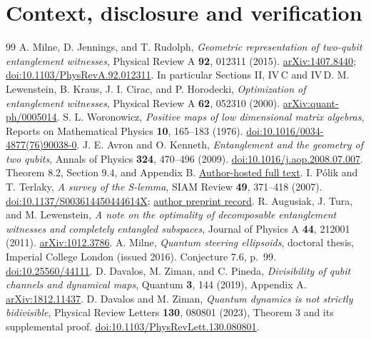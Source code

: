 \documentclass[11pt,a4paper]{article}
\theoremstyle{definition}\newtheorem{definition}[theorem]{Definition}
\theoremstyle{plain}\newtheorem*{theorem*}{Theorem}
\begin{document}
\part{Context, disclosure and verification}

\appendix

\clearpage
\begin{thebibliography}{99}
 A. Milne, D. Jennings, and T. Rudolph, \emph{Geometric representation of two-qubit entanglement witnesses}, Physical Review A \textbf{92}, 012311 (2015). \href{https://arxiv.org/abs/1407.8440}{arXiv:1407.8440}; \href{https://doi.org/10.1103/PhysRevA.92.012311}{doi:10.1103/PhysRevA.92.012311}. In particular Sections II, IV\,C and IV\,D.
 M. Lewenstein, B. Kraus, J. I. Cirac, and P. Horodecki, \emph{Optimization of entanglement witnesses}, Physical Review A \textbf{62}, 052310 (2000). \href{https://arxiv.org/abs/quant-ph/0005014}{arXiv:quant-ph/0005014}.
 S. L. Woronowicz, \emph{Positive maps of low dimensional matrix algebras}, Reports on Mathematical Physics \textbf{10}, 165--183 (1976). \href{https://doi.org/10.1016/0034-4877(76)90038-0}{doi:10.1016/0034-4877(76)90038-0}.
 J. E. Avron and O. Kenneth, \emph{Entanglement and the geometry of two qubits}, Annals of Physics \textbf{324}, 470--496 (2009). \href{https://doi.org/10.1016/j.aop.2008.07.007}{doi:10.1016/j.aop.2008.07.007}. Theorem 8.2, Section 9.4, and Appendix B. \href{https://phsites.technion.ac.il/avron/wp-content/uploads/sites/3/2013/05/Ann_Phys_324_470_2009.pdf}{Author-hosted full text}.
 I. P\'olik and T. Terlaky, \emph{A survey of the S-lemma}, SIAM Review \textbf{49}, 371--418 (2007). \href{https://doi.org/10.1137/S003614450444614X}{doi:10.1137/S003614450444614X}; \href{https://optimization-online.org/2004/10/968/}{author preprint record}.
 R. Augusiak, J. Tura, and M. Lewenstein, \emph{A note on the optimality of decomposable entanglement witnesses and completely entangled subspaces}, Journal of Physics A \textbf{44}, 212001 (2011). \href{https://arxiv.org/abs/1012.3786}{arXiv:1012.3786}.
 A. Milne, \emph{Quantum steering ellipsoids}, doctoral thesis, Imperial College London (issued 2016). Conjecture 7.6, p.~99. \href{https://doi.org/10.25560/44111}{doi:10.25560/44111}.
 D. Davalos, M. Ziman, and C. Pineda, \emph{Divisibility of qubit channels and dynamical maps}, Quantum \textbf{3}, 144 (2019), Appendix A. \href{https://arxiv.org/abs/1812.11437}{arXiv:1812.11437}.
 D. Davalos and M. Ziman, \emph{Quantum dynamics is not strictly bidivisible}, Physical Review Letters \textbf{130}, 080801 (2023), Theorem 3 and its supplemental proof. \href{https://doi.org/10.1103/PhysRevLett.130.080801}{doi:10.1103/PhysRevLett.130.080801}.

\end{thebibliography}
\end{document}
